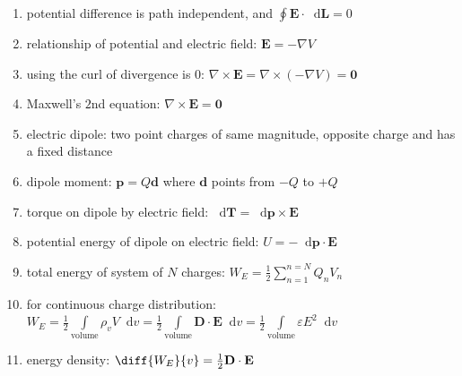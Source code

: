 \documentclass[a4paper,11pt]{article}
\newcommand*\dd{\mathop{}\!\mathrm{d}}
\newcommand{\grad}{\nabla}
\newcommand{\curl}{\nabla \times}
\newcommand{\bvec}[1]{\mathbf{#1}}
\begin{document}
\begin{enumerate}
		\item potential difference is path independent, and $\oint \bvec{E} \cdot \dd\bvec{L} = 0$ 
		\item relationship of potential and electric field: $\bvec{E} = -\grad V$
		\item using the curl of divergence is 0: $\curl\bvec{E} = \curl(-\grad V) = \bvec{0}$
		\item Maxwell's $2$nd equation: $\boxed{\curl\bvec{E} = \bvec{0}}$
		\item electric dipole: two point charges of same magnitude, opposite charge and has a fixed distance 
		\item dipole moment: $\bvec{p} = Q\bvec{d}$ where $\bvec{d}$ points from $-Q$ to $+Q$
		\item torque on dipole by electric field: $\dd\bvec{T} = \dd\bvec{p}\times\bvec{E}$
		\item potential energy of dipole on electric field: $U = -\dd\bvec{p}\cdot\bvec{E}$
		\item total energy of system of $N$ charges: $W_E = \frac{1}{2}\sum_{n = 1}^{n = N}Q_nV_n$
		\item for continuous charge distribution: $W_E = \frac{1}{2}\int\limits_\text{volume} \rho_v V \dd v = \frac{1}{2}\int\limits_\text{volume} \bvec{D} \cdot \bvec{E} \dd v = \frac{1}{2}\int\limits_\text{volume} \varepsilon E^2 \dd v$
		\item energy density: $\diff{W_E}{v} = \frac{1}{2}\bvec{D}\cdot\bvec{E}$
	\end{enumerate}
\end{document}
